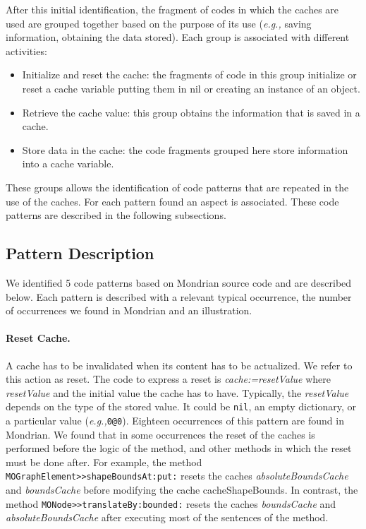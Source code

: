 \documentclass[preprint,10pt]{sigplanconf}
\newcommand{\ct}{\lstinline[backgroundcolor=\color{white},basicstyle=\footnotesize\ttfamily]}
\newcommand{\ab}[1]{\nb{Alexandre}{blue}{#1}}
\newcommand{\sv}[1]{\nb{Santiago}{orange}{#1}}
\newcommand{\eg}{\emph{e.g.,}\xspace}
\newcommand{\seclabel}[1]{\label{sec:#1}}
\begin{document}
After this initial identification, the fragment of codes in which the caches are used
are grouped together based on the purpose of its use (\eg saving information, obtaining the data stored). Each group is associated with different activities:
\begin{itemize}
\item Initialize and reset the cache: the fragments of code in this group initialize or reset a cache variable putting them in nil or creating an instance of an object.
\item Retrieve the cache value: this group obtains the information that is saved in a cache.
\item Store data in the cache: the code fragments grouped here store information into a cache variable.
\end{itemize}

These groups allows the identification of code patterns that are
repeated in the use of the caches. For each pattern found an aspect is associated. These code patterns are described in the following subsections.

\subsection{Pattern Description}\seclabel{Pattern-Identification}


We identified 5 code patterns based on Mondrian source code and are described below.
Each pattern is described with a relevant typical occurrence,
the number of occurrences we found in Mondrian and an illustration.

\paragraph{Reset Cache.} A cache has to be invalidated when its content has to be actualized. We refer to this action as reset. The code to express a reset is \emph{cache:=resetValue} where
\emph{resetValue} and the initial value the cache has to have. Typically, the \emph{resetValue} depends on the type of the stored value. It could be \ct{nil}, an empty dictionary, or a particular value (\eg \ct{0@0}).
Eighteen occurrences of this pattern are found in Mondrian. 
We found that in some occurrences the reset of the caches is performed before the logic of the method, and other methods in which the reset must be done after. For example, the method \ct{MOGraphElement>>shapeBoundsAt:put:} resets the caches \emph{absoluteBoundsCache} and \emph{boundsCache} before modifying the cache cacheShapeBounds. In contrast, the method \ct{MONode>>translateBy:bounded:} resets the caches \emph{boundsCache} and \emph{absoluteBoundsCache} after executing most of the sentences of the method. 
\end{document}
